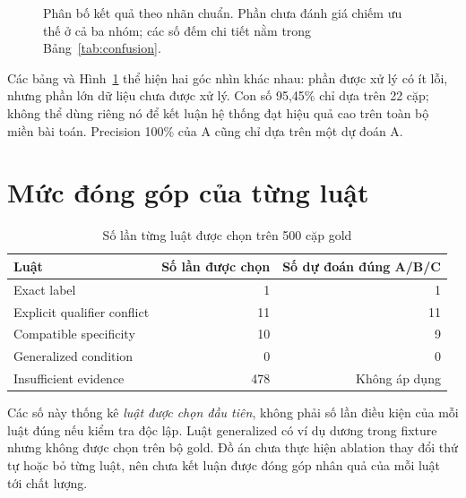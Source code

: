 \begin{figure}[htbp]
\centering
{}
\caption{Phân bố kết quả theo nhãn chuẩn. Phần chưa đánh giá chiếm ưu thế
ở cả ba nhóm; các số đếm chi tiết nằm trong Bảng~\ref{tab:confusion}.}
\label{fig:coverage}
\end{figure}
\FloatBarrier

Các bảng và Hình~\ref{fig:coverage} thể hiện hai góc nhìn khác nhau:
phần được xử lý có ít lỗi, nhưng phần lớn dữ liệu chưa được xử lý.
Con số 95,45\% chỉ dựa trên 22 cặp; không thể dùng riêng nó để kết luận
hệ thống đạt hiệu quả cao trên toàn bộ miền bài toán.
Precision 100\% của A cũng chỉ dựa trên một dự đoán A.

\section{Mức đóng góp của từng luật}
\begin{table}[htbp]
\centering\small
\caption{Số lần từng luật được chọn trên 500 cặp gold}\label{tab:rulecount}
\begin{tabular}{lrr}
\toprule
Luật & Số lần được chọn & Số dự đoán đúng A/B/C\\
\midrule
Exact label & 1 & 1\\
Explicit qualifier conflict & 11 & 11\\
Compatible specificity & 10 & 9\\
Generalized condition & 0 & 0\\
Insufficient evidence & 478 & Không áp dụng\\
\bottomrule
\end{tabular}
\end{table}
Các số này thống kê \emph{luật được chọn đầu tiên}, không phải số lần
điều kiện của mỗi luật đúng nếu kiểm tra độc lập. Luật generalized có
ví dụ dương trong fixture nhưng không được chọn trên bộ gold.
Đồ án chưa thực hiện ablation thay đổi thứ tự hoặc bỏ từng luật,
nên chưa kết luận được đóng góp nhân quả của mỗi luật tới chất lượng.

